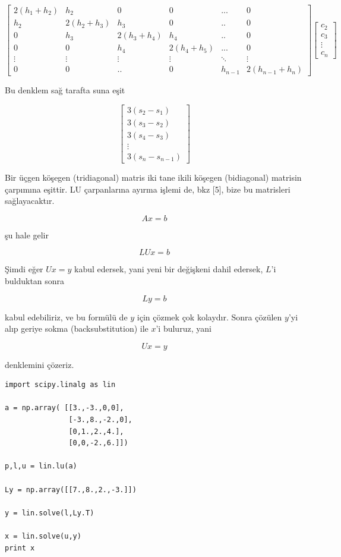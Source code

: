 \documentclass[12pt,fleqn]{article}\usepackage{../../common}
\begin{document}
$$ 
\left[\begin{array}{cccccc}
2(h_1+h_2) & h_2 & 0 & 0 & ... & 0 \\
h_2 & 2(h_2+h_3) & h_3 & 0 & .. & 0  \\
0 & h_3 & 2(h_3+h_4) & h_4 & .. & 0 \\
0 & 0 & h_4 & 2(h_4+h_5) & ... & 0 \\
\vdots & \vdots & \vdots & \vdots & \ddots & \vdots  \\
0 & 0 & .. & 0 & h_{n-1} & 2(h_{n-1}+h_n) 
\end{array}\right]
\left[\begin{array}{r}
c_2 \\ c_3 \\ \vdots \\ c_n
\end{array}\right]
 $$

Bu denklem sağ tarafta suna eşit 

$$ 
\left[\begin{array}{r}
3(s_2 - s_1) \\
3(s_3 - s_2) \\
3(s_4 - s_3) \\
\vdots \\
3(s_n - s_{n-1}) 
\end{array}\right]
 $$

 Bir üçgen köşegen (tridiagonal) matris iki tane ikili köşegen (bidiagonal)
 matrisin çarpımına eşittir. LU çarpanlarına ayırma işlemi de, bkz [5], bize
 bu matrisleri sağlayacaktır.

$$ Ax = b $$

şu hale gelir

$$ LUx = b $$

Şimdi eğer $Ux = y$ kabul edersek, yani yeni bir değişkeni dahil edersek,
$L$'i bulduktan sonra

$$ Ly = b $$

kabul edebiliriz, ve bu formülü de $y$ için çözmek çok kolaydır. Sonra
çözülen $y$'yi alıp geriye sokma (backsubstitution) ile $x$'i buluruz, yani 

$$ Ux = y $$ 

denklemini çözeriz. 

\begin{verbatim}
import scipy.linalg as lin

a = np.array( [[3.,-3.,0,0],
               [-3.,8.,-2.,0],
               [0,1.,2.,4.],
               [0,0,-2.,6.]])

p,l,u = lin.lu(a)

Ly = np.array([[7.,8.,2.,-3.]])

y = lin.solve(l,Ly.T)

x = lin.solve(u,y)
print x
\end{verbatim}
\end{document}
